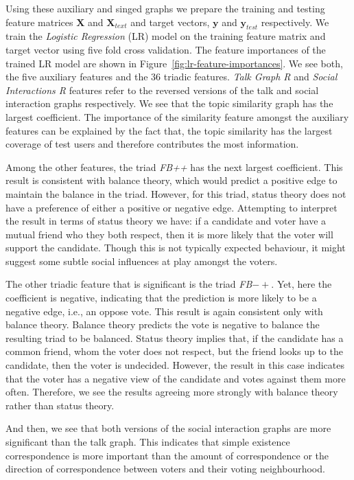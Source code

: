 Using these auxiliary and singed graphs we prepare the training and testing feature matrices $\mathbf{X}$ and $\mathbf{X}_{text}$ and target vectors, $\mathbf{y}$ and $\mathbf{y}_{test}$ respectively.
We train the \textit{Logistic Regression} (LR) model on the training feature matrix and target vector using five fold cross validation.
The feature importances of the trained LR model are shown in Figure~\ref{fig:lr-feature-importances}.
We see both, the five auxiliary features and the 36 triadic features.
\textit{Talk Graph R} and \textit{Social Interactions R} features refer to the reversed versions of the talk and social interaction graphs respectively.
We see that the topic similarity graph has the largest coefficient.
The importance of the similarity feature amongst the auxiliary features can be explained by the fact that, the topic similarity has the largest coverage of test users and therefore contributes the most information.

Among the other features, the triad \textit{FB++} has the next largest coefficient.
This result is consistent with balance theory, which would predict a positive edge to maintain the balance in the triad.
However, for this triad, status theory does not have a preference of either a positive or negative edge.
Attempting to interpret the result in terms of status theory we have: if a candidate and voter have a mutual friend who they both respect, then it is more likely that the voter will support the candidate.
Though this is not typically expected behaviour, it might suggest some subtle social influences at play amongst the voters. 

The other triadic feature that is significant is the triad \textit{FB}$-+$.
Yet, here the coefficient is negative, indicating that the prediction is more likely to be a negative edge, i.e., an oppose vote.
This result is again consistent only with balance theory.
Balance theory predicts the vote is negative to balance the resulting triad to be balanced.
Status theory implies that, if the candidate has a common friend, whom the voter does not respect, but the friend looks up to the candidate, then the voter is undecided.
However, the result in this case indicates that the voter has a negative view of the candidate and votes against them more often.
Therefore, we see the results agreeing more strongly with balance theory rather than status theory.

And then, we see that both versions of the social interaction graphs are more significant than the talk graph.
This indicates that simple existence correspondence is more important than the amount of correspondence or the direction of correspondence between voters and their voting neighbourhood.

